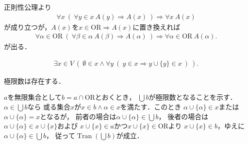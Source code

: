 	\begin{prf}
		正則性公理より
		\begin{align}
			\forall x\ \left(\ \forall y \in x\ A(y)
			\Longrightarrow A(x)\ \right)
			\Longrightarrow \forall x\ A(x)
		\end{align}
		が成り立つが，$A(x)$を$x \in \mathrm{OR} \Longrightarrow A(x)$に置き換えれば
		\begin{align}
			\forall \alpha \in \mathrm{OR}\ 
			\left(\ \forall \beta \in \alpha\ A(\beta)
			\Longrightarrow A(\alpha)\ \right)
			\Longrightarrow \forall \alpha \in \mathrm{OR}\ A(\alpha).
		\end{align}
		が出る．
		\QED
	\end{prf}
	
	\begin{screen}
		\begin{axm}[無限公理]
			\begin{align}
				\exists x \in V\ (\ \emptyset \in x \wedge \forall y\ (\ y \in x
				\Longrightarrow y \cup \{y\} \in x\ )\ ).
			\end{align}
		\end{axm}
	\end{screen}
	
	\begin{screen}
		\begin{thm}[極限数の存在定理]
			極限数は存在する．
		\end{thm}
	\end{screen}
	
	\begin{prf}
		$a$を無限集合として$b = a \cap \mathrm{OR}$とおくとき，
		$\bigcup b$が極限数となることを示す．
		$\alpha \in \bigcup b$なら
		或る集合$x$が$x \in b \wedge \alpha \in x$を満たす．このとき
		$\alpha \cup \{\alpha\} \in x$または$\alpha \cup \{\alpha\} = x$となるが，
		前者の場合は$\alpha \cup \{\alpha\} \in \bigcup b$，
		後者の場合は$\alpha \cup \{\alpha\} \in x \cup \{x\}$および
		$x \cup \{x\} \in a$かつ$x \cup \{x\} \in \mathrm{OR}$より
		$x \cup \{x\} \in b$，ゆえに$\alpha \cup \{\alpha\} \in \bigcup b$，
		従って$\operatorname*{Tran}(\bigcup b)$が成立．
	\end{prf}
	
	
